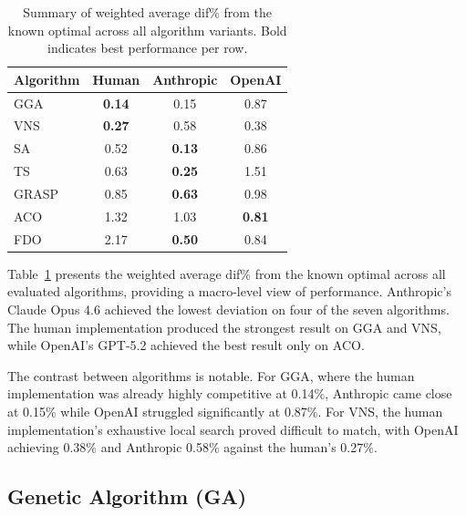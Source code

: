 \documentclass[11pt]{article}
\begin{document}
\begin{table}[H]
\centering
\caption{Summary of weighted average dif\% from the known optimal across all algorithm 
variants. Bold indicates best performance per row.}
\label{tab:summary-comparison}
\begin{tabular}{l ccc}
\toprule
Algorithm & Human & Anthropic & OpenAI \\
\midrule
GGA   & \textbf{0.14} & 0.15 & 0.87 \\
VNS   & \textbf{0.27} & 0.58 & 0.38 \\
SA    & 0.52          & \textbf{0.13} & 0.86 \\
TS    & 0.63          & \textbf{0.25} & 1.51 \\
GRASP & 0.85          & \textbf{0.63} & 0.98 \\
ACO   & 1.32          & 1.03 & \textbf{0.81} \\
FDO   & 2.17          & \textbf{0.50} & 0.84 \\
\bottomrule
\end{tabular}
\end{table}

Table~\ref{tab:summary-comparison} presents the weighted average dif\% from the known optimal across all evaluated algorithms, providing a macro-level view of performance. Anthropic's Claude Opus 4.6 achieved the lowest deviation on four of the seven algorithms. The human implementation produced the strongest result on GGA and VNS, while OpenAI's GPT-5.2 achieved the best result only on ACO.

The contrast between algorithms is notable. For GGA, where the human implementation was already highly competitive at 0.14\%, Anthropic came close at 0.15\% while OpenAI struggled significantly at 0.87\%. For VNS, the human implementation's exhaustive local search proved difficult to match, with OpenAI achieving 0.38\% and Anthropic 0.58\% against the human's 0.27\%.

\subsection{Genetic Algorithm (GA)}
\end{document}
